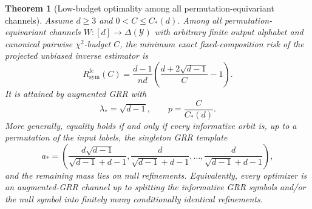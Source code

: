 \documentclass[11pt]{amsart}
\numberwithin{equation}{section}
\newtheorem{theorem}{Theorem}[section]
\theoremstyle{definition}
\begin{document}
\begin{theorem}[Low-budget optimality among all permutation-equivariant channels]\label{thm:equivariant-opt}
Assume \(d\ge 3\) and \(0<C\le C_\ast(d)\).
Among all permutation-equivariant channels \(W:[d]\to\Delta(\mathcal Y)\) with arbitrary finite output
alphabet and canonical pairwise \(\chi^2\)-budget \(C\), the minimum exact fixed-composition risk of the
projected unbiased inverse estimator is
\[
R^{\mathrm{fc}}_{\mathrm{sym}}(C)
=
\frac{d-1}{nd}\left(\frac{d+2\sqrt{d-1}}{C}-1\right). \tag{11.10}\label{eq:equivariant-opt-risk}
\]
It is attained by augmented GRR with
\[
\lambda_\ast=\sqrt{d-1},
\qquad
p=\frac{C}{C_\ast(d)}. \tag{11.11}\label{eq:equivariant-opt-channel}
\]
More generally, equality holds if and only if every informative orbit is, up to a permutation of the input
labels, the singleton GRR template
\[
a_\ast
=
\left(
\frac{d\sqrt{d-1}}{\sqrt{d-1}+d-1},
\frac{d}{\sqrt{d-1}+d-1},
\dots,
\frac{d}{\sqrt{d-1}+d-1}
\right), \tag{11.12}\label{eq:grr-template}
\]
and the remaining mass lies on null refinements.
Equivalently, every optimizer is an augmented-GRR channel up to splitting the informative GRR symbols
and/or the null symbol into finitely many conditionally identical refinements.
\end{theorem}
\end{document}
